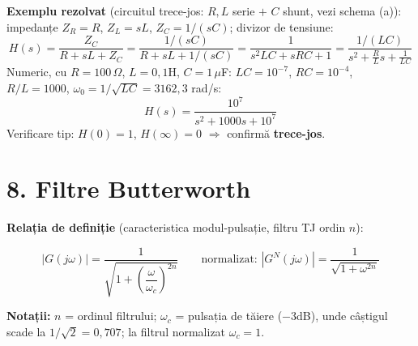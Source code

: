 \documentclass[10pt,a4paper]{article}
\begin{document}
\begin{center}
\end{center}

\textbf{Exemplu rezolvat} (circuitul trece-jos: $R,L$ serie $+$ $C$ shunt, vezi schema (a)): impedanțe $Z_R=R$, $Z_L=sL$, $Z_C=1/(sC)$; divizor de tensiune:
$$H(s)=\dfrac{Z_C}{R+sL+Z_C}=\dfrac{1/(sC)}{R+sL+1/(sC)}=\dfrac{1}{s^2LC+sRC+1}=\dfrac{1/(LC)}{s^2+\frac{R}{L}s+\frac{1}{LC}}$$
Numeric, cu $R=100\,\Omega$, $L=0{,}1$H, $C=1\,\mu$F: $LC=10^{-7}$, $RC=10^{-4}$, $R/L=1000$, $\omega_0=1/\sqrt{LC}=3162{,}3$ rad/s:
$$H(s)=\dfrac{10^7}{s^2+1000s+10^7}$$
Verificare tip: $H(0)=1$, $H(\infty)=0$ $\Rightarrow$ confirmă \textbf{trece-jos}.

\section*{8. Filtre Butterworth}
\textbf{Relația de definiție} (caracteristica modul-pulsație, filtru TJ ordin $n$):
\begin{keyeq}\color{red!65!black}
$$|G(j\omega)|=\dfrac{1}{\sqrt{1+\left(\dfrac{\omega}{\omega_c}\right)^{2n}}} \qquad\text{normalizat: } |G^N(j\omega)|=\dfrac{1}{\sqrt{1+\omega^{2n}}}$$
\end{keyeq}
\textbf{Notații:} $n$ = ordinul filtrului; $\omega_c$ = pulsația de tăiere ($-3$dB), unde câștigul scade la $1/\sqrt2=0{,}707$; la filtrul normalizat $\omega_c=1$.
\end{document}
